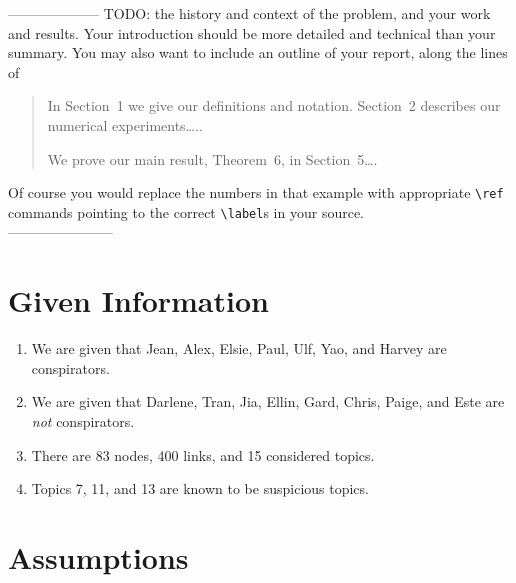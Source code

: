 \documentclass{icmmcm}
\begin{document}
\noindent -------------------- TODO:
the history and context of the problem,
and your work and results.  Your introduction should be more detailed
and technical than your summary.  You may also want to include an
outline of your report, along the lines of
\begin{quotation}
  In Section~1 we give our definitions and notation. Section~2
  describes our numerical experiments\ldots{}..
  
  We prove our main result, Theorem~6, in Section~5\ldots{}.
\end{quotation}
Of course you would replace the numbers in that example with
appropriate \verb|\ref| commands pointing to the correct
\verb|\label|s in your source.\\
-----------------------

\section{Given Information}
\begin{enumerate}
\item We are given that Jean, Alex, Elsie, Paul, Ulf, Yao,
and Harvey are conspirators.
\item We are given that Darlene, Tran, Jia, Ellin, Gard, Chris,
Paige, and Este are \textit{not} conspirators.
\item There are 83 nodes, 400 links, and 15 considered topics.
\item Topics 7, 11, and 13 are known to be suspicious topics.
\end{enumerate}

\section{Assumptions}
\end{document}
